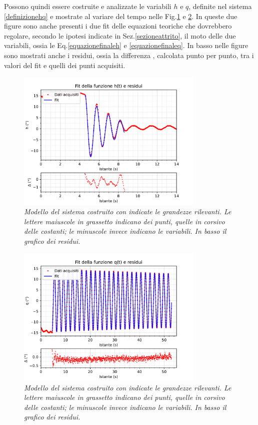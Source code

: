 \documentclass[11pt, a4paper, twoside]{article}
\begin{document}
Possono quindi essere costruite e analizzate le variabili $h$ e $q$, definite nel sistema \ref{definizionehq}
e mostrate al variare del tempo nelle Fig.\ref{fit_h} e \ref{fit_q}.
In queste due figure sono anche presenti i due fit delle equazioni teoriche che dovrebbero regolare,
secondo le ipotesi indicate in Sez.\ref{sezioneattrito}, il moto delle due variabili, ossia le Eq.\ref{equazionefinaleh}
 e \ref{equazionefinaleq}. In basso nelle figure sono mostrati anche i residui, ossia la differenza
, calcolata punto per punto, tra i valori del fit e quelli dei punti acquisiti.
\begin{figure}[h!]
  \centering
  \includegraphics[width=0.8\textwidth]{../../media/plot/fit_h.pdf}
  \caption{\textit{Modello del sistema costruito con indicate
   le grandezze rilevanti. Le lettere maiuscole in grassetto indicano dei punti, quelle in corsivo delle 
   costanti; le minuscole invece indicano le variabili. In basso il grafico dei residui.} }
  \label{fit_h}
\end{figure}

\begin{figure}[h!]
  \centering
  \includegraphics[width=0.8\textwidth]{../../media/plot/fit_q.pdf}
  \caption{\textit{Modello del sistema costruito con indicate
   le grandezze rilevanti. Le lettere maiuscole in grassetto indicano dei punti, quelle in corsivo delle 
   costanti; le minuscole invece indicano le variabili. In basso il grafico dei residui.} }
  \label{fit_q}
\end{figure}
\end{document}
